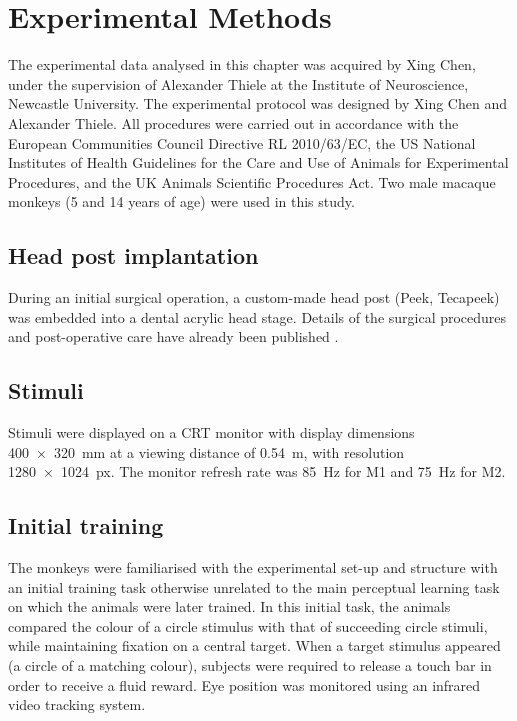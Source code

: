 \section{Experimental Methods}
\label{ch:exp}

The experimental data analysed in this chapter was acquired by Xing Chen, under the supervision of Alexander Thiele at the Institute of Neuroscience, Newcastle University.
The experimental protocol was designed by Xing Chen and Alexander Thiele.
All procedures were carried out in accordance with the European Communities Council Directive RL 2010/63/EC, the US National Institutes of Health Guidelines for the Care and Use of Animals for Experimental Procedures, and the UK Animals Scientific Procedures Act. Two male macaque monkeys (5 and 14 years of age) were used in this study.


\subsection{Head post implantation}

During an initial surgical operation, a custom-made head post (Peek, Tecapeek) was embedded into a dental acrylic head stage.
Details of the surgical procedures and post-operative care have already been published \citep[see][]{Thiele2006}.


\subsection{Stimuli}

Stimuli were displayed on a \ac{CRT} monitor with display dimensions \SI{400x320}{\milli\metre} at a viewing distance of \SI{0.54}{\metre}, with resolution \SI{1280x1024}{px}.
The monitor refresh rate was \SI{85}{Hz} for \ac{M1} and \SI{75}{Hz} for \ac{M2}.


\subsection{Initial training}

The monkeys were familiarised with the experimental set-up and structure with an initial training task otherwise unrelated to the main perceptual learning task on which the animals were later trained.
In this initial task, the animals compared the colour of a circle stimulus with that of succeeding circle stimuli, while maintaining fixation on a central target.
When a target stimulus appeared (a circle of a matching colour), subjects were required to release a touch bar in order to receive a fluid reward.
Eye position was monitored using an infrared video tracking system.%


